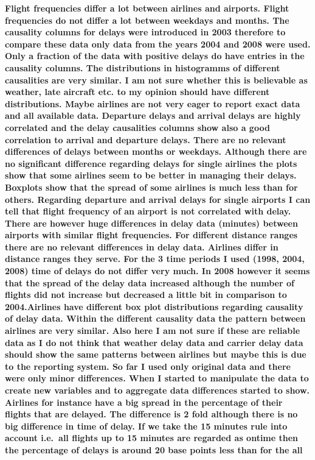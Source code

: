 \documentclass[11pt]{article}
\begin{document}
\textbf{Flight frequencies differ a lot between airlines and airports.
Flight frequencies do not differ a lot between weekdays and months. The
causality columns for delays were introduced in 2003 therefore to
compare these data only data from the years 2004 and 2008 were used.
Only a fraction of the data with positive delays do have entries in the
causality columns. The distributions in histogramms of different
causalities are very similar. I am not sure whether this is believable
as weather, late aircraft etc. to my opinion should have different
distributions. Maybe airlines are not very eager to report exact data
and all available data. Departure delays and arrival delays are highly
correlated and the delay causalities columns show also a good
correlation to arrival and departure delays. There are no relevant
differences of delays between months or weekdays. Although there are no
significant difference regarding delays for single airlines the plots
show that some airlines seem to be better in managing their delays.
Boxplots show that the spread of some airlines is much less than for
others. Regarding departure and arrival delays for single airports I can
tell that flight frequency of an airport is not correlated with delay.
There are however huge differences in delay data (minutes) between
airports with similar flight frequencies. For different distance ranges
there are no relevant differences in delay data. Airlines differ in
distance ranges they serve. For the 3 time periods I used (1998, 2004,
2008) time of delays do not differ very much. In 2008 however it seems
that the spread of the delay data increased although the number of
flights did not increase but decreased a little bit in comparison to
2004.Airlines have different box plot distributions regarding causality
of delay data. Within the different causality data the pattern between
airlines are very similar. Also here I am not sure if these are reliable
data as I do not think that weather delay data and carrier delay data
should show the same patterns between airlines but maybe this is due to
the reporting system. So far I used only original data and there were
only minor differences. When I started to manipulate the data to create
new variables and to aggregate data differences started to show.
Airlines for instance have a big spread in the percentage of their
flights that are delayed. The difference is 2 fold although there is no
big difference in time of delay. If we take the 15 minutes rule into
account i.e.~all flights up to 15 minutes are regarded as ontime then
the percentage of delays is around 20 base points less than for the all
}
\end{document}
